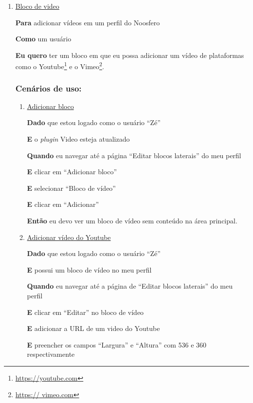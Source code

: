 \begin{enumerate}

\item \underline{Bloco de video}

\textbf{Para} adicionar vídeos em um perfil do Noosfero

\textbf{Como} um usuário

\textbf{Eu quero} ter um bloco em que eu possa adicionar um vídeo de plataformas
como o Youtube\footnote{\url{https://youtube.com}} e o Vimeo\footnote{\url{https://
vimeo.com}}.

\subsubsection*{Cenários de uso:}

\begin{enumerate}

\item \underline{Adicionar bloco}

\textbf{Dado} que estou logado como o usuário ``Zé''

\textbf{E} o \textit{plugin} Video esteja atualizado

\textbf{Quando} eu navegar até a página ``Editar blocos laterais'' do meu perfil

\textbf{E} clicar em ``Adicionar bloco''

\textbf{E} selecionar ``Bloco de vídeo''

\textbf{E} clicar em ``Adicionar''

\textbf{Então} eu devo ver um bloco de vídeo sem conteúdo na área principal.


\item \underline{Adicionar vídeo do Youtube}

\textbf{Dado} que estou logado como o usuário ``Zé''

\textbf{E} possui um bloco de vídeo no meu perfil

\textbf{Quando} eu navegar até a página de ``Editar blocos laterais'' do meu perfil

\textbf{E} clicar em ``Editar'' no bloco de vídeo

\textbf{E} adicionar a URL de um video do Youtube

\textbf{E} preencher os campos ``Largura'' e ``Altura'' com 536 e 360
respectivamente


\end{enumerate}
\end{enumerate}
